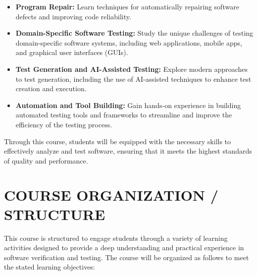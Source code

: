 \documentclass [11pt]{article}
\begin{document}
\begin{itemize}
    \item \textbf{Program Repair:} Learn techniques for automatically repairing software defects and improving code reliability.
    \item \textbf{Domain-Specific Software Testing:} Study the unique challenges of testing domain-specific software systems, including web applications, mobile apps, and graphical user interfaces (GUIs).
    \item \textbf{Test Generation and AI-Assisted Testing:} Explore modern approaches to test generation, including the use of AI-assisted techniques to enhance test creation and execution.
    \item \textbf{Automation and Tool Building:} Gain hands-on experience in building automated testing tools and frameworks to streamline and improve the efficiency of the testing process.
\end{itemize}

Through this course, students will be equipped with the necessary skills to effectively analyze and test software, ensuring that it meets the highest standards of quality and performance.

\section*{COURSE ORGANIZATION / STRUCTURE}

This course is structured to engage students through a variety of learning activities designed to provide a deep understanding and practical experience in software verification and testing. The course will be organized as follows to meet the stated learning objectives:
\end{document}
